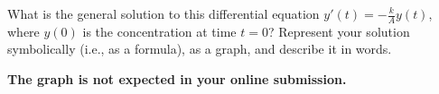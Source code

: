 \documentclass{ximera}
\begin{document}
\begin{question}
What is the general solution to this differential equation $y'(t)=-\frac{k}{A}y(t)$, where $y(0)$ is the concentration at time $t=0$? 
 Represent your solution symbolically (i.e., as a formula), as a graph, and describe it in words.   
\begin{prompt}
\textbf{The graph is not expected in your online submission.}
\end{prompt}
\begin{freeResponse}
\end{freeResponse}
\end{question}

\end{document}
